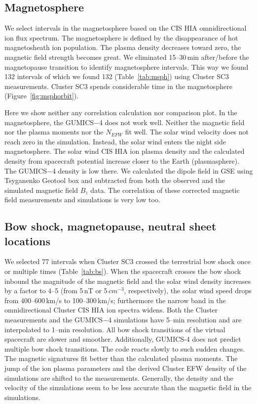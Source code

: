\documentclass[draft]{agujournal2019}
\begin{document}
\subsection{Magnetosphere}
\label{sec:msph}

We select intervals in the magnetosphere based on the CIS HIA omnidirectional ion flux spectrum. The magnetosphere is defined by the disappearance of hot magnetosheath ion population. The plasma density decreases toward zero, the magnetic field strength becomes great. We eliminated 15--30\,min after/before the magnetopause transition to identify magnetosphere intervals. This way we found 132 intervals of which we found 132 (Table~\ref{tab:msph}) using Cluster SC3 measurements. Cluster SC3 spends considerable time in the magnetosphere (Figure~\ref{fig:msphorbit}). 

Here we show neither any correlation calculation nor comparison plot. In the magnetosphere, the GUMICS$-$4 does not work well. Neither the magnetic field nor the plasma moments nor the $N_{EFW}$ fit well. The solar wind velocity does not reach zero in the simulation. Instead, the solar wind enters the night side magnetosphere. The solar wind CIS HIA ion plasma density and the calculated density from spacecraft potential increase closer to the Earth (plasmasphere). The GUMICS$-$4 density is low there. We calculated the dipole field in GSE using Tsyganenko Geotool box \cite{tsyganenko95:_model_earth} and subtracted from both the observed and the simulated magnetic field $B_z$ data. The correlation of these corrected magnetic field measurements and simulations is very low too. 

\subsection{Bow shock, magnetopause, neutral sheet locations}
\label{sec:bs}

We selected 77 intervals when Cluster SC3 crossed the terrestrial bow shock once or multiple times (Table~\ref{tab:bs}). When the spacecraft crosses the bow shock inbound the magnitude of the magnetic field and the solar wind density increases by a factor to 4--5 (from 5\,nT or 5\,$cm^{-3}$, respectively), the solar wind speed drops from 400--600\,km/s to 100--300\,km/s; furthermore the narrow band in the omnidirectional Cluster CIS HIA ion spectra widens. Both the Cluster measurements and the GUMICS$-$4 simulations have 5--min resolution and are interpolated to 1--min resolution. All bow shock transitions of the virtual spacecraft are slower and smoother. Additionally, GUMICS-4 does not predict multiple bow shock transitions. The code reacts slowly to such sudden changes. The magnetic signatures fit better than the calculated plasma moments. The jump of the ion plasma parameters and the derived Cluster EFW density of the simulations are shifted to the measurements. Generally, the density and the velocity of the simulations seem to be less accurate than the magnetic field in the simulations.
\end{document}
